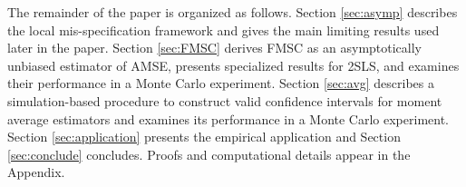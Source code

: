 The remainder of the paper is organized as follows.
Section \ref{sec:asymp} describes the local mis-specification framework and gives the main limiting results used later in the paper. 
Section \ref{sec:FMSC} derives FMSC as an asymptotically unbiased estimator of AMSE, presents specialized results for 2SLS, and examines their performance in a Monte Carlo experiment. 
Section \ref{sec:avg} describes a simulation-based procedure to construct valid confidence intervals for moment average estimators and examines its performance in a Monte Carlo experiment. Section \ref{sec:application} presents the empirical application and Section \ref{sec:conclude} concludes.
Proofs and computational details appear in the Appendix.